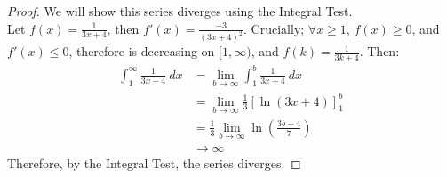 \documentclass{article}
\begin{document}
			\begin{proof}
			We will show this series diverges using the Integral Test.\\
			Let $f(x) = \frac{1}{3x+4}$, then $f'(x) = \frac{-3}{(3x+4)^2}$. Crucially; $\forall x \geq 1$, $f(x) \geq 0$, and $f'(x) \leq 0$, therefore is decreasing on $[1, \infty)$, and $f(k) = \frac{1}{3k+4}$. Then:
			\begin{align*}
			\int_1^\infty \frac{1}{3x+4}\ dx &= \lim_{b \to \infty} \int_1^b \frac{1}{3x+4}\ dx\\
			&= \lim_{b \to \infty} \frac{1}{3}\left[\ln(3x+4)\right]_1^b\\
			&= \frac{1}{3}\lim_{b \to \infty} \ln\left(\frac{3b+4}{7}\right)\\
			&\to \infty
			\end{align*}
			Therefore, by the Integral Test, the series diverges.
			\end{proof}
			
\end{document}
